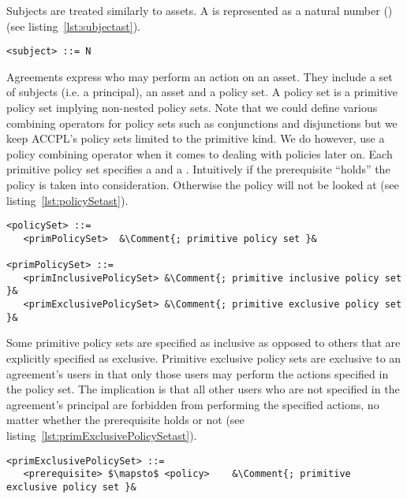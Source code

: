 Subjects are treated similarly to assets. A  is represented as a natural number () (see listing~\ref{lst:subjectast}).

\lstset{mathescape, language=AST}  
\begin{lstlisting}[frame=single, caption={subject},label={lst:subjectast}]
<subject> ::= N
\end{lstlisting}

Agreements express who may perform an action on an asset. They include a set of subjects (i.e. a principal), an asset and a policy set. A policy set is a primitive policy set implying non-nested policy sets. Note that we could define various combining operators for policy sets such as conjunctions and disjunctions but we keep \ac{ACCPL}'s policy sets limited to the primitive kind. We do however, use a policy combining operator when it comes to dealing with policies later on. Each primitive policy set specifies a  and a . Intuitively if the prerequisite ``holds'' the policy is taken into consideration. Otherwise the policy will not be looked at (see listing~\ref{lst:policySetast}).


\newcommand*{\Comment}[1]{\hfill\makebox[7.0cm][l]{#1}}%
\lstset{mathescape, language=AST, escapechar=\&}  
\begin{minipage}[c]{0.95\textwidth}
\begin{lstlisting}[frame=single, caption={policySet and primPolicySet},label={lst:policySetast}]
<policySet> ::=  
   <primPolicySet>	&\Comment{; primitive policy set }&
   
<primPolicySet> ::=  
   <primInclusivePolicySet>	&\Comment{; primitive inclusive policy set }&
   <primExclusivePolicySet>	&\Comment{; primitive exclusive policy set }&
\end{lstlisting}
\end{minipage}

Some primitive policy sets are specified as inclusive as opposed to others that are explicitly specified as exclusive. Primitive exclusive policy sets are exclusive to an agreement's users in that only those users may perform the actions specified in the policy set. The implication is that all other users who are not specified in the agreement's principal are forbidden from performing the specified actions, no matter whether the prerequisite holds or not (see listing~\ref{lst:primExclusivePolicySetast}).

\lstset{mathescape, language=AST, escapechar=\&}  
\begin{lstlisting}[frame=single, caption={primExclusivePolicySet},label={lst:primExclusivePolicySetast}]
<primExclusivePolicySet> ::=  
   <prerequisite> $\mapsto$ <policy>	&\Comment{; primitive exclusive policy set }&
\end{lstlisting}

